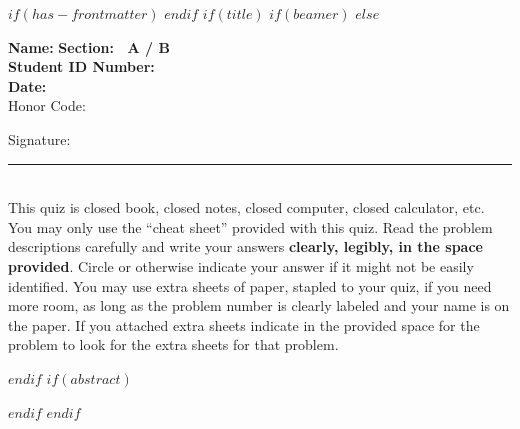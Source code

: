 $if(has-frontmatter)$
\frontmatter
$endif$
$if(title)$
$if(beamer)$
\frame{\titlepage}
$else$
\maketitle

\newcommand{\littleblank}{\rule{.5in}{.01in}~~}
\newcommand{\bigblank}{\rule{2.5in}{.01in}~~}
\renewcommand{\setminus}{\backslash}


\raggedbottom

\vspace{-.6in}

\textbf{Name:} \underline{\hspace*{3in}} 
\hfill
\textbf{Section:~ A / B} ~ ~ ~ \\[2mm]

\textbf{Student ID Number:} \underline{\hspace*{3in}} \\[2mm]

\textbf{Date:} \underline{\hspace*{1.5in}} \\ 

{\Large{Honor Code:}}
\vspace{.6in}

Signature: \bigblank\\


This quiz is closed book, closed notes, closed computer, closed calculator,
etc. 
You may only use the ``cheat sheet'' provided with this quiz. 
Read the problem descriptions carefully and write your answers \textbf{clearly, legibly, in the space provided}. 
Circle or otherwise indicate your answer if it might not be easily identified. 
You may use extra sheets of paper, stapled to your quiz, if you need more room, as long as the problem number is clearly labeled and your name is on the paper. 
If you attached extra sheets indicate in the provided space for the problem to look for the extra sheets for that problem.

\pagebreak

$endif$
$if(abstract)$
\begin{abstract}
$abstract$
\end{abstract}
$endif$
$endif$

